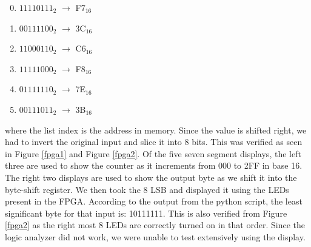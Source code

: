 \documentclass[letterpaper, 12pt]{article} %
\begin{document}
\begin{multicols}{2}
\begin{enumerate}
\setcounter{enumi}{-1}
    \item $11110111_2$ $\longrightarrow$ F$7_{16}$
    \item $00111100_2$ $\longrightarrow$ 3C$_{16}$
    \item $11000110_2$ $\longrightarrow$ C$6_{16}$
\setcounter{enumi}{764}
    \item $11111000_2$ $\longrightarrow$ F$8_{16}$
    \item $01111110_2$ $\longrightarrow$ 7E$_{16}$
    \item $00111011_2$ $\longrightarrow$ 3B$_{16}$
\end{enumerate}
\end{multicols}
where the list index is the address in memory. Since the value is shifted right, we had to invert the original input and slice it into 8 bits.
This was verified as seen in Figure \ref{fpga1} and Figure \ref{fpga2}. Of the five seven segment displays, the left three are used to show the counter as it increments from 000 to 2FF in base 16. The right two displays are used to show the output byte as we shift it into the byte-shift register. We then took the 8 LSB and displayed it using the LEDs present in the FPGA. According to the output from the python script, the least significant byte for that input is: 10111111. This is also verified from Figure \ref{fpga2} as the right most 8 LEDs are correctly turned on in that order.
Since the logic analyzer did not work, we were unable to test extensively using the display.
\end{document}
